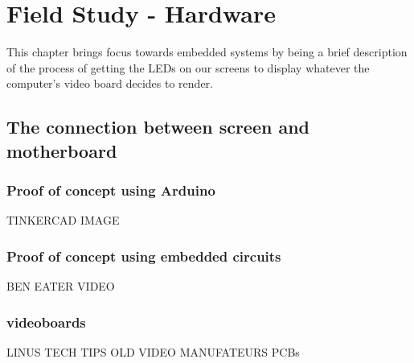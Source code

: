 


\chapter*{Field Study - Hardware}
  This chapter brings focus towards embedded systems by being a brief description of the process of getting the LEDs on our screens to display whatever the computer's video board decides to render. 
  \section*{The connection between screen and motherboard}
    \subsection*{Proof of concept using Arduino}
      TINKERCAD IMAGE
    \subsection*{Proof of concept using embedded circuits}
      BEN EATER VIDEO
    \subsection*{videoboards}
      LINUS TECH TIPS OLD VIDEO MANUFATEURS PCBs

